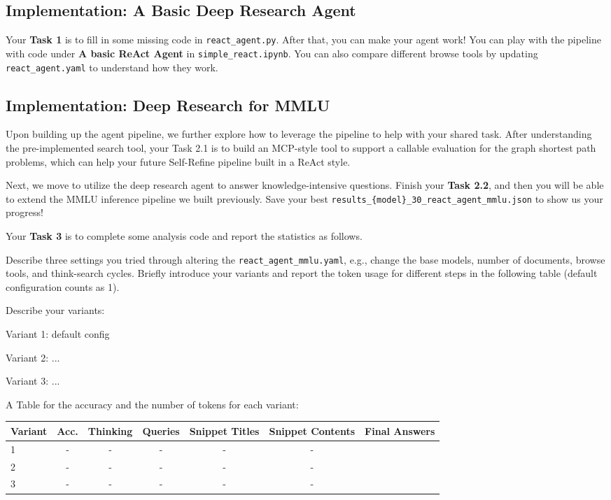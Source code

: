 \documentclass{article}
\begin{document}
\subsection{Implementation: A Basic Deep Research Agent}
\label{sec:basic_deep_research}
Your \textbf{Task 1} is to fill in some missing code in \texttt{react\_agent.py}. After that, you can make your agent work! You can play with the pipeline with code under \textbf{A basic ReAct Agent} in \texttt{simple\_react.ipynb}. You can also compare different browse tools by updating \texttt{react\_agent.yaml} to understand how they work.

\subsection{Implementation: Deep Research for MMLU}
\label{sec:short_form_tasks}

Upon building up the agent pipeline, we further explore how to leverage the pipeline to help with your shared task. After understanding the pre-implemented search tool, your Task 2.1 is to build an MCP-style tool to support a callable evaluation for the graph shortest path problems, which can help your future Self-Refine pipeline built in a ReAct style. 

Next, we move to utilize the deep research agent to answer knowledge-intensive questions. Finish your \textbf{Task 2.2}, and then you will be able to extend the MMLU inference pipeline we built previously. Save your best \texttt{results\_\{model\}\_30\_react\_agent\_mmlu.json} to show us your progress! 

Your \textbf{Task 3} is to complete some analysis code and report the statistics as follows.

Describe three settings you tried through altering the \texttt{react\_agent\_mmlu.yaml}, e.g., change the base models, number of documents, browse tools, and think-search cycles. Briefly introduce your variants and report the token usage for different steps in the following table (default configuration counts as 1).

\begin{solve}
Describe your variants:

Variant 1: default config


Variant 2: ...

Variant 3: ...


A Table for the accuracy and the number of tokens for each variant:

\begin{tabular}{l|c|ccccc}
\toprule
Variant & Acc.& Thinking & Queries & Snippet Titles & Snippet Contents & Final Answers\\ \toprule
1 & - & - & - & - & - \\ 
2 & - & - & - & - & - \\ 
3 & - & - & - & - & - \\ 
\bottomrule
\end{tabular}
    
\end{solve}
\end{document}
